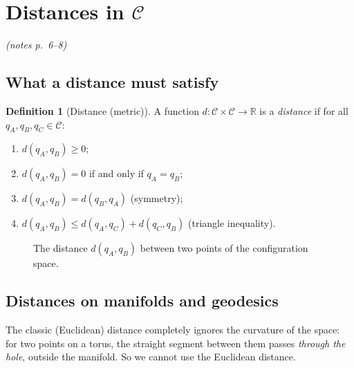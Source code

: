 \documentclass[11pt,a4paper]{article}
\newcommand{\R}{\mathbb{R}}
\newcommand{\C}{\mathcal{C}}
\newcommand{\pts}[1]{\emph{(notes p.~#1)}}
\theoremstyle{definition}
\newtheorem{definition}{Definition}[section]
\theoremstyle{plain}
\theoremstyle{remark}
\begin{document}
\section{Distances in $\C$}\pts{6--8}

\subsection{What a distance must satisfy}

\begin{definition}[Distance (metric)]
A function $d:\C\times\C\to\R$ is a \emph{distance} if for all $q_A,q_B,q_C\in\C$:
\begin{enumerate}[nosep,label=(\roman*)]
  \item $d(q_A,q_B)\ge 0$;
  \item $d(q_A,q_B)=0$ if and only if $q_A=q_B$;
  \item $d(q_A,q_B)=d(q_B,q_A)$ (symmetry);
  \item $d(q_A,q_B)\le d(q_A,q_C)+d(q_C,q_B)$ (triangle inequality).
\end{enumerate}
\end{definition}


\begin{figure}[ht]
\centering
{}
\caption{The distance $d(q_A,q_B)$ between two points of the configuration space.}
\end{figure}

\subsection{Distances on manifolds and geodesics}

The classic (Euclidean) distance completely ignores the curvature of the space: for two points on a torus, the straight segment between them passes \emph{through the hole}, outside the manifold. So we cannot use the Euclidean distance.
\end{document}
